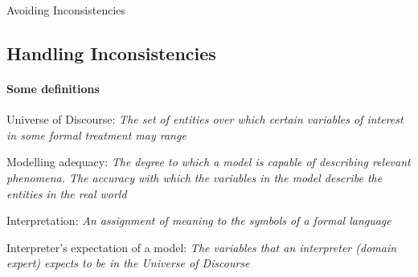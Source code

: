 \begin{frame}{Avoiding Inconsistencies}
    \subsection{Handling Inconsistencies}
\framesubtitle{Some definitions}
    \footnotesize

%

    \begin{definition}
        Universe of Discourse: \textit{The set of entities over which certain variables of interest in some formal treatment may range}
    \end{definition}

    \begin{definition}
        Modelling adequacy: \textit{The degree to which a model is capable of describing relevant phenomena. The accuracy with which the variables in the model describe the entities in the real world}
    \end{definition}

    \begin{definition}
        Interpretation: \textit{An assignment of meaning to the symbols of a formal language}
    \end{definition}


    \begin{definition}
        Interpreter's expectation of a model: \textit{The variables that an interpreter (domain expert) expects to be in the Universe of Discourse}
    \end{definition}
\end{frame}
